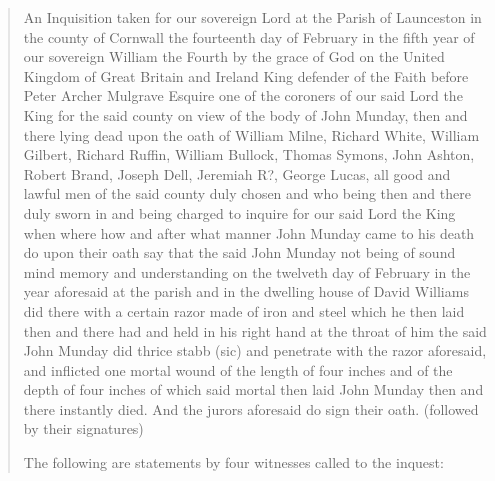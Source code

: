 \begin{quotation}
An Inquisition taken for our sovereign Lord at the Parish of Launceston in the county of Cornwall the fourteenth day of February in the fifth year of our sovereign William the Fourth by the grace of God on the United Kingdom of Great Britain and Ireland King defender of the Faith before Peter Archer Mulgrave Esquire one of the coroners of our said Lord the King for the said county on view of the body of John Munday, then and there lying dead upon the oath of William Milne, Richard White, William Gilbert, Richard Ruffin, William Bullock, Thomas Symons, John Ashton, Robert Brand, Joseph Dell, Jeremiah R?, George Lucas, all good and lawful men of the said county duly chosen and who being then and there duly sworn in and being charged to inquire for our said Lord the King when where how and after what manner John Munday came to his death do upon their oath say that the said John Munday not being of sound mind memory and understanding on the twelveth day of February in the year aforesaid at the parish and in the dwelling house of David Williams did there with a certain razor made of iron and steel which he then laid then and there had and held in his right hand at the throat of him the said John Munday did thrice stabb (sic) and penetrate with the razor aforesaid, and inflicted one mortal wound of the length of four inches and of the depth of four inches of which said mortal then laid John Munday then and there instantly died. And the jurors aforesaid do sign their oath. (followed by their signatures)

The following are statements by four witnesses called to the inquest:


\end{quotation}
